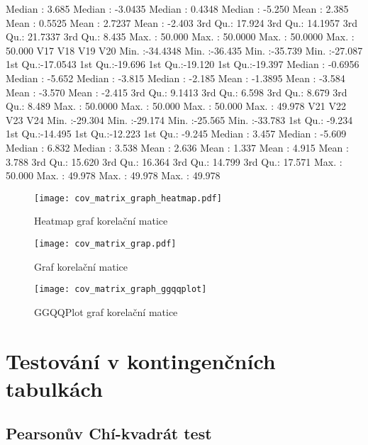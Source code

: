 \documentclass[a4paper, 12pt]{article}
\begin{document}
\begin{table}[H]
\begin{Schunk}
\begin{Soutput}
 Median :  3.685   Median : -3.0435   Median :  0.4348   Median : -5.250  
 Mean   :  2.385   Mean   :  0.5525   Mean   :  2.7237   Mean   : -2.403  
 3rd Qu.: 17.924   3rd Qu.: 14.1957   3rd Qu.: 21.7337   3rd Qu.:  8.435  
 Max.   : 50.000   Max.   : 50.0000   Max.   : 50.0000   Max.   : 50.000  
      V17                V18               V19               V20         
 Min.   :-34.4348   Min.   :-36.435   Min.   :-35.739   Min.   :-27.087  
 1st Qu.:-17.0543   1st Qu.:-19.696   1st Qu.:-19.120   1st Qu.:-19.397  
 Median : -0.6956   Median : -5.652   Median : -3.815   Median : -2.185  
 Mean   : -1.3895   Mean   : -3.584   Mean   : -3.570   Mean   : -2.415  
 3rd Qu.:  9.1413   3rd Qu.:  6.598   3rd Qu.:  8.679   3rd Qu.:  8.489  
 Max.   : 50.0000   Max.   : 50.000   Max.   : 50.000   Max.   : 49.978  
      V21               V22               V23               V24         
 Min.   :-29.304   Min.   :-29.174   Min.   :-25.565   Min.   :-33.783  
 1st Qu.: -9.234   1st Qu.:-14.495   1st Qu.:-12.223   1st Qu.: -9.245  
 Median :  3.457   Median : -5.609   Median :  6.832   Median :  3.538  
 Mean   :  2.636   Mean   :  1.337   Mean   :  4.915   Mean   :  3.788  
 3rd Qu.: 15.620   3rd Qu.: 16.364   3rd Qu.: 14.799   3rd Qu.: 17.571  
 Max.   : 50.000   Max.   : 49.978   Max.   : 49.978   Max.   : 49.978  
\end{Soutput}
\end{Schunk}
\end{table}

\begin{figure}[H]
\centering

\texttt{[image: cov\_matrix\_graph\_heatmap.pdf]}
\caption{Heatmap graf korelační matice}

\texttt{[image: cov\_matrix\_grap.pdf]}
\caption{Graf korelační matice}
\end{figure}

\begin{figure}[H]
\centering
\texttt{[image: cov\_matrix\_graph\_ggqqplot]}
\caption{GGQQPlot graf korelační matice}

\end{figure}

\section{Testování v kontingenčních tabulkách}
\subsection{Pearsonův Chí-kvadrát test}
\end{document}
